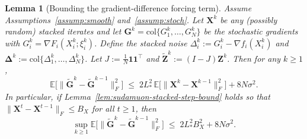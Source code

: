 \documentclass{article}
\newtheorem{lemma}{Lemma}
\begin{document}
\begin{lemma}[Bounding the gradient-difference forcing term]
\label{lem:sudamuon-grad-diff-forcing}
Assume Assumptions~\ref{assump:smooth} and~\ref{assump:stoch}.
Let $\mathbf{X}^k$ be any (possibly random) stacked iterates and let
$\mathbf{G}^k=\mathrm{col}\{G_1^k,\ldots,G_N^k\}$ be the stochastic gradients with
$G_i^k=\nabla F_i(X_i^k;\xi_i^k)$.
Define the stacked noise $\Delta_i^k:=G_i^k-\nabla f_i(X_i^k)$ and $\mathbf{\Delta}^k:=\mathrm{col}\{\Delta_1^k,\ldots,\Delta_N^k\}$.
Let $J:=\tfrac1N\mathbf{1}\mathbf{1}^\top$ and $\tilde{\mathbf Z}^k:=(I-J)\mathbf Z^k$.
Then for any $k\ge 1$,
\begin{equation}
\label{eq:sudamuon-tildeG-diff-bound}
\mathbb{E}\big[\|\tilde{\mathbf G}^k-\tilde{\mathbf G}^{k-1}\|_F^2\big]
\;\le\;
2L_*^2\,\mathbb{E}\big[\|\mathbf X^k-\mathbf X^{k-1}\|_F^2\big]
+8N\sigma^2.
\end{equation}
In particular, if Lemma~\ref{lem:sudamuon-stacked-step-bound} holds so that
$\|\mathbf X^t-\mathbf X^{t-1}\|_F\le B_X$ for all $t\ge 1$, then
\begin{equation}
\label{eq:sudamuon-tildeG-diff-uniform}
\sup_{k\ge 1}\mathbb{E}\big[\|\tilde{\mathbf G}^k-\tilde{\mathbf G}^{k-1}\|_F^2\big]
\;\le\;
2L_*^2 B_X^2 + 8N\sigma^2.
\end{equation}
\end{lemma}
\end{document}
